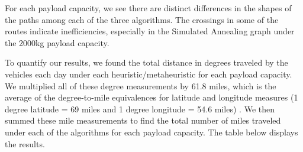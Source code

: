 \documentclass[11pt]{article}
\begin{document}
For each payload capacity, we see there are distinct differences in the shapes of the paths among each of the three algorithms. The crossings in some of the routes indicate inefficiencies, especially in the Simulated Annealing graph under the 2000kg payload capacity. %


To quantify our results, we found the total distance in degrees traveled by the vehicles each day under each heuristic/metaheuristic for each payload capacity.  We multiplied all of these degree measurements by 61.8 miles, which is the average of the degree-to-mile equivalences for latitude and longitude measures (1 degree latitude = 69 miles and 1 degree longitude = 54.6 miles) \cite{lat_long_miles}. We then summed these mile measurements to find the total number of miles traveled under each of the algorithms for each payload capacity.  The table below displays the results.
\end{document}
